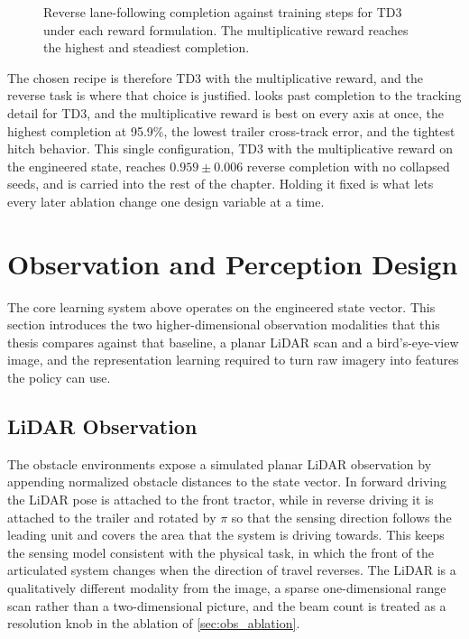 \begin{figure}[H]
    \centering
    \caption{Reverse lane-following completion against training steps for TD3 under each reward formulation. The multiplicative reward reaches the highest and steadiest completion.}
    \label{fig:reverse_reward_ablation}
\end{figure}

The chosen recipe is therefore TD3 with the multiplicative reward, and the reverse task is where that choice is justified.  looks past completion to the tracking detail for TD3, and the multiplicative reward is best on every axis at once, the highest completion at 95.9\%, the lowest trailer cross-track error, and the tightest hitch behavior. This single configuration, TD3 with the multiplicative reward on the engineered state, reaches $0.959 \pm 0.006$ reverse completion with no collapsed seeds, and is carried into the rest of the chapter. Holding it fixed is what lets every later ablation change one design variable at a time.



\section{Observation and Perception Design}
\label{sec:perception}

The core learning system above operates on the engineered state vector. This section introduces the two higher-dimensional observation modalities that this thesis compares against that baseline, a planar LiDAR scan and a bird's-eye-view image, and the representation learning required to turn raw imagery into features the policy can use.

\subsection{LiDAR Observation}

The obstacle environments expose a simulated planar LiDAR observation by appending normalized obstacle distances to the state vector. In forward driving the LiDAR pose is attached to the front tractor, while in reverse driving it is attached to the trailer and rotated by $\pi$ so that the sensing direction follows the leading unit and covers the area that the system is driving towards. This keeps the sensing model consistent with the physical task, in which the front of the articulated system changes when the direction of travel reverses. The LiDAR is a qualitatively different modality from the image, a sparse one-dimensional range scan rather than a two-dimensional picture, and the beam count is treated as a resolution knob in the ablation of \cref{sec:obs_ablation}.

